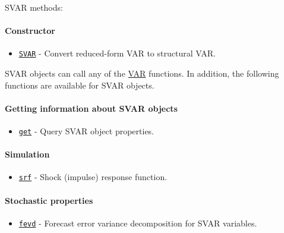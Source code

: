 

	SVAR methods:

\paragraph{Constructor}\label{constructor}

\begin{itemize}
\itemsep1pt\parskip0pt
\item
  \href{SVAR/SVAR}{\texttt{SVAR}} - Convert reduced-form VAR to
  structural VAR.
\end{itemize}

SVAR objects can call any of the \href{VAR/Contents}{VAR} functions. In
addition, the following functions are available for SVAR objects.

\paragraph{Getting information about SVAR
objects}\label{getting-information-about-svar-objects}

\begin{itemize}
\itemsep1pt\parskip0pt
\item
  \href{SVAR/get}{\texttt{get}} - Query SVAR object properties.
\end{itemize}

\paragraph{Simulation}\label{simulation}

\begin{itemize}
\itemsep1pt\parskip0pt
\item
  \href{SVAR/srf}{\texttt{srf}} - Shock (impulse) response function.
\end{itemize}

\paragraph{Stochastic properties}\label{stochastic-properties}

\begin{itemize}
\itemsep1pt\parskip0pt
\item
  \href{SVAR/fevd}{\texttt{fevd}} - Forecast error variance
  decomposition for SVAR variables.
\end{itemize}

